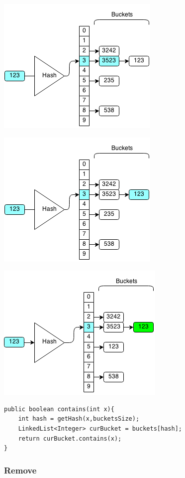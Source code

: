 \documentclass[11pt,oneside]{book}
\makeatletter
\def\maxwidth#1{\ifdim\Gin@nat@width>#1 #1\else\Gin@nat@width\fi}
\makeatother
\begin{document}
\includegraphics[width=\maxwidth{\textwidth}]{hashsetcontains.png}

\includegraphics[width=\maxwidth{\textwidth}]{hashsetcontains2.png}

\includegraphics[width=\maxwidth{\textwidth}]{hashsetcontains3.png}

\begin{lstlisting}
public boolean contains(int x){
    int hash = getHash(x,bucketsSize);
    LinkedList<Integer> curBucket = buckets[hash];
    return curBucket.contains(x);
}
\end{lstlisting}

\subsubsection{Remove}
\end{document}
